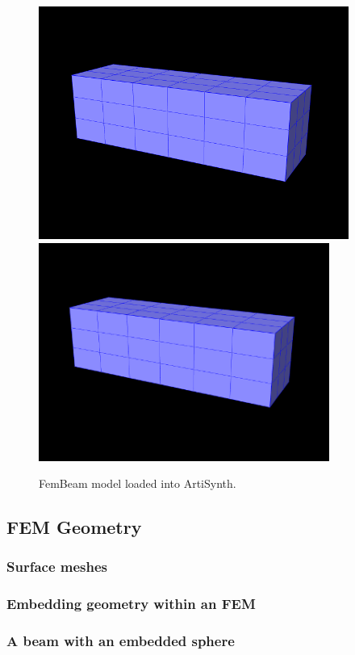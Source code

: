 \begin{figure}[h]
\begin{center}
\iflatexml
 \includegraphics[]{images/FemBeam}
\else
 \includegraphics[width=3.75in]{images/FemBeam}
\fi
\end{center}
\caption{FemBeam model loaded into ArtiSynth.}
\label{FemBeam:fig}
\end{figure}

\subsection{FEM Geometry}

\subsubsection{Surface meshes}

\subsubsection{Embedding geometry within an FEM}

\subsubsection{A beam with an embedded sphere}


